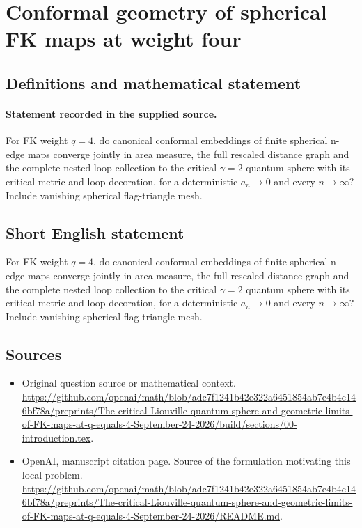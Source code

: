 \documentclass[11pt]{article}
\begin{document}
\section*{Conformal geometry of spherical FK maps at weight four}\label{30007352}
\subsection{Definitions and mathematical statement}
\paragraph{Statement recorded in the supplied source.}
For FK weight $q=4$, do canonical conformal embeddings of finite spherical n-edge maps converge jointly in area measure, the full rescaled distance graph and the complete nested loop collection to the critical $\gamma =2$ quantum sphere with its critical metric and loop decoration, for a deterministic $a_n\to 0$ and every $n\to \infty $? Include vanishing spherical flag-triangle mesh.
\subsection{Short English statement}
For FK weight $q=4$, do canonical conformal embeddings of finite spherical n-edge maps converge jointly in area measure, the full rescaled distance graph and the complete nested loop collection to the critical $\gamma =2$ quantum sphere with its critical metric and loop decoration, for a deterministic $a_n\to 0$ and every $n\to \infty $? Include vanishing spherical flag-triangle mesh.
\subsection{Sources}
\begin{itemize}
\item[S1] Original question source or mathematical context.
\url{https://github.com/openai/math/blob/adc7f1241b42e322a6451854ab7e4b4c146bf78a/preprints/The-critical-Liouville-quantum-sphere-and-geometric-limits-of-FK-maps-at-q-equals-4-September-24-2026/build/sections/00-introduction.tex}.
\item[S2] OpenAI, manuscript citation page. Source of the formulation motivating this local problem.
\url{https://github.com/openai/math/blob/adc7f1241b42e322a6451854ab7e4b4c146bf78a/preprints/The-critical-Liouville-quantum-sphere-and-geometric-limits-of-FK-maps-at-q-equals-4-September-24-2026/README.md}.
\end{itemize}
\end{document}
